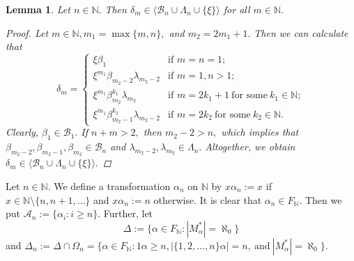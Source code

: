 \documentclass[11pt]{article}
\theoremstyle{plain}
\newtheorem{lemma}[theorem]{Lemma}
\theoremstyle{definition}
\begin{document}
\begin{lemma}\label{Proposition6}
Let $n\in\mathbb{N}.$ Then $\delta_{m}\in\langle \mathcal{B}_{n}\cup \Lambda_{n}\cup \{\xi\} \rangle$ for all $m\in\mathbb{N}.$
\begin{proof}
Let $m\in\mathbb{N},m_{1}=\max\{m,n\},$ and $m_{2}=2m_{1}+1.$ Then we can calculate that
$$\delta_{m}=\begin{cases}
\xi\beta_{1}~~&\text{if }m=n=1;\\
\xi^{m_{1}}\beta_{m_{2}-2}\lambda_{m_{2}-2}&\text{if }m=1,n>1;\\
\xi^{m_{1}}\beta_{m_{2}}^{k_{1}}\lambda_{m_{2}}&\text{if }m=2k_{1}+1~\text{for some}~k_{1}\in\mathbb{N};\\
\xi^{m_{1}}\beta_{m_{2}-1}^{k_{2}}\lambda_{m_{2}-2}&\text{if }m=2k_{2}~\text{for some}~k_{2}\in\mathbb{N}.
\end{cases}$$
Clearly, $\beta_{1}\in\mathcal{B}_{1}.$ If $n+m>2,$ then $m_{2}-2>n,$ which implies that $\beta_{m_{2}-2},\beta_{m_{2}-1},\beta_{m_{2}}\in\mathcal{B}_{n}$ and $\lambda_{m_{2}-2}, \lambda_{m_{2}}\in\Lambda_{n}.$ Altogether, we obtain $\delta_{m}\in\langle \mathcal{B}_{n}\cup\Lambda_{n}\cup\{\xi\}\rangle.$
\end{proof}
\end{lemma}
\noindent Let $n\in\mathbb{N}.$ We define a transformation $\alpha_{n}$ on $\mathbb{N}$ by $x\alpha_{n}:=x$ if $x\in\mathbb{N}\setminus\{n,n+1,\ldots\}$ and $x\alpha_{n}:=n$ otherwise. It is clear that $\alpha_{n}\in F_{\mathbb{N}}.$ Then we put $\mathcal{A}_{n}:=\{\alpha_{i}:i\geq n\}.$ Further, let $$\Delta:=\{\alpha\in F_{\mathbb{N}}:\left\vert M_{\alpha}^{*}\right\vert=\aleph_{0}\}$$ and $\Delta_{n}:=\Delta\cap\Omega_{n}=\{\alpha\in F_{\mathbb{N}}:1\alpha\geq n,\left\vert \{1,2,\ldots,n\}\alpha\right\vert=n,~\text{and}~\left\vert M_{\alpha}^{*}\right\vert=\aleph_{0}\}.$ 
\end{document}
